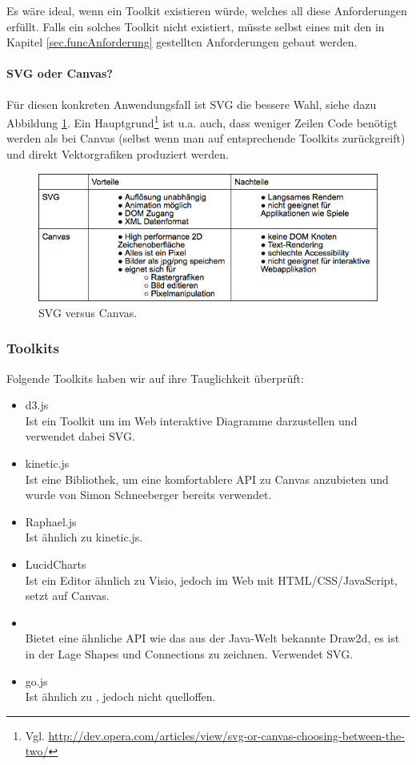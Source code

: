 Es wäre ideal, wenn ein Toolkit existieren würde, welches all diese
Anforderungen erfüllt. Falls ein solches Toolkit nicht existiert,
müsste selbst eines mit den in Kapitel \ref{sec.funcAnforderung}
gestellten Anforderungen gebaut werden.

\paragraph{SVG oder Canvas?} Für diesen konkreten Anwendungsfall ist
SVG die bessere Wahl, siehe dazu Abbildung \ref{fig.svgVsCanvas}.
Ein Hauptgrund\footnote{Vgl. \url{http://dev.opera.com/articles/view/svg-or-canvas-choosing-between-the-two/}} ist u.a. auch, dass weniger Zeilen Code benötigt werden
als bei Canvas (selbst wenn man auf entsprechende Toolkits zurückgreift)
und direkt Vektorgrafiken produziert werden.

\begin{figure}[h!]
  \centering
  \includegraphics[width=1.0\textwidth]{Figures/Svg_vs_Canvas.png}
  \caption{SVG versus Canvas.}\label{fig.svgVsCanvas}
\end{figure}


\subsubsection{Toolkits}

Folgende Toolkits haben wir auf ihre Tauglichkeit überprüft:

\begin{itemize}
  \item d3.js \\
  Ist ein Toolkit um im Web interaktive Diagramme darzustellen und
  verwendet dabei SVG.
  \item kinetic.js \\
  Ist eine Bibliothek, um eine komfortablere API zu Canvas anzubieten
  und wurde von Simon Schneeberger bereits verwendet.
  \item Raphael.js \\
  Ist ähnlich zu kinetic.js.
  \item LucidCharts \\
  Ist ein Editor ähnlich zu Visio, jedoch im Web mit HTML/CSS/JavaScript,
  setzt auf Canvas.
  \item \dd \\
  Bietet eine ähnliche API wie das aus der Java-Welt bekannte Draw2d,
  es ist in der Lage Shapes und Connections zu zeichnen.
  Verwendet SVG.
  \item go.js \\
  Ist ähnlich zu \dd, jedoch nicht quelloffen.
\end{itemize}


